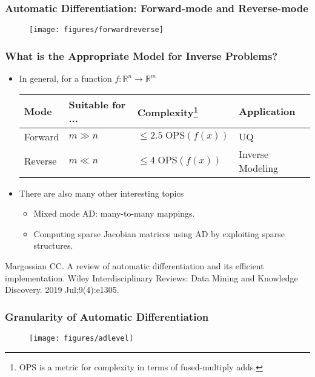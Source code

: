 \documentclass[usenames,dvipsnames]{beamer}
\newcommand{\RR}[0]{\mathbb{R}}
\begin{document}
\begin{frame}
	\frametitle{Automatic Differentiation: Forward-mode and Reverse-mode}
	\begin{figure}
		\centering
		\texttt{[image: figures/forwardreverse]}
	\end{figure}
\end{frame}


\begin{frame}
	\frametitle{What is the Appropriate Model for Inverse Problems?}
	
	\begin{itemize}
		\item In general, for a function $f:\RR^n \rightarrow \RR^m$
		\begin{table}[]
			\centering
			\begin{tabular}{@{}llll@{}}
				\toprule
				Mode & Suitable for ... & Complexity\footnote{$\mathrm{OPS}$ is a metric for complexity in terms of fused-multiply adds.} & Application \\ \midrule
				Forward & $m\gg n$ & $\leq 2.5\;\mathrm{OPS}(f(x))$ & UQ \\
				Reverse & $m\ll n$ & $\leq 4\;\mathrm{OPS}(f(x))$ & Inverse Modeling \\ \bottomrule
			\end{tabular}
		\end{table}
		
		
		\item There are also many other interesting topics
		\begin{itemize}
			\item Mixed mode AD: many-to-many mappings.
			\item Computing sparse Jacobian matrices using AD by exploiting sparse structures. 
		\end{itemize}
	\end{itemize}
	{\scriptsize Margossian CC. A review of automatic differentiation and its efficient implementation. Wiley Interdisciplinary Reviews: Data Mining and Knowledge Discovery. 2019 Jul;9(4):e1305.} 
\end{frame}






\begin{frame}
	\frametitle{Granularity of Automatic Differentiation}
	
	
	\begin{figure}[hbt]
		\centering
		\texttt{[image: figures/adlevel]}
	\end{figure}
	
	
	
\end{frame}
\end{document}
